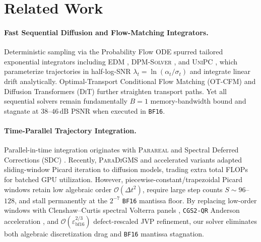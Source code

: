 \documentclass[11pt,a4paper]{article}
\theoremstyle{definition}
\theoremstyle{remark}
\newcommand{\bfsixteen}{\texttt{BF16}}
\newcommand{\epsbf}{\varepsilon_{\mathrm{bf16}}}
\begin{document}
\section{Related Work}
\label{sec:related}
\paragraph{Fast Sequential Diffusion and Flow-Matching Integrators.}
Deterministic sampling via the Probability Flow ODE \citep{song2021denoising,song2021scorebased} spurred tailored exponential integrators including \textsc{EDM} \citep{karras2022elucidating}, \textsc{DPM-Solver} \citep{lu2022dpmsolver}, and \textsc{UniPC} \citep{zhao2023unipc}, which parameterize trajectories in half-log-SNR $\lambda_t = \ln(\alpha_t/\sigma_t)$ and integrate linear drift analytically. Optimal-Transport Conditional Flow Matching (\textsc{OT-CFM}) \citep{lipman2023flow,tong2024improving} and Diffusion Transformers (\textsc{DiT}) \citep{peebles2023scalable} further straighten transport paths. Yet all sequential solvers remain fundamentally $B=1$ memory-bandwidth bound and stagnate at $38$--$46\,\mathrm{dB}$ PSNR when executed in \bfsixteen{}.

\paragraph{Time-Parallel Trajectory Integration.}
Parallel-in-time integration originates with \textsc{Parareal} \citep{lions2001parareal} and Spectral Deferred Corrections (\textsc{SDC}) \citep{dutt2000spectral}. Recently, \textsc{ParaDiGMS} \citep{shih2023parallel} and accelerated variants \citep{tang2024accelerating} adapted sliding-window Picard iteration to diffusion models, trading extra total FLOPs for batched GPU utilization. However, piecewise-constant/trapezoidal Picard windows retain low algebraic order $\mathcal{O}(\Delta t^2)$, require large step counts $S \sim 96$--$128$, and stall permanently at the $2^{-7}$ \bfsixteen{} mantissa floor. By replacing low-order windows with Clenshaw--Curtis spectral Volterra panels \citep{clenshaw1960method,trefethen2008gauss}, \texttt{CGS2-QR} Anderson acceleration \citep{anderson1965iterative,walker2011anderson}, and $\mathcal{O}(\epsbf^{2/3})$ defect-rescaled JVP refinement, our solver eliminates both algebraic discretization drag and \bfsixteen{} mantissa stagnation.
\end{document}
